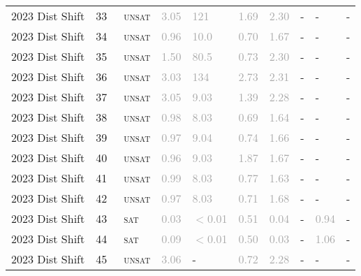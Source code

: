 \begin{center}
{\begin{longtable}{@{}llllllllll@{}}
2023 Dist Shift & 33 & ~\textsc{unsat} & \textcolor{darkgray}{3.05} & \textcolor{darkgray}{121} & \textcolor{darkgray}{1.69} & \textcolor{darkgray}{2.30} & - & - & - \\
2023 Dist Shift & 34 & ~\textsc{unsat} & \textcolor{darkgray}{0.96} & \textcolor{darkgray}{10.0} & \textcolor{darkgray}{0.70} & \textcolor{darkgray}{1.67} & - & - & - \\
2023 Dist Shift & 35 & ~\textsc{unsat} & \textcolor{darkgray}{1.50} & \textcolor{darkgray}{80.5} & \textcolor{darkgray}{0.73} & \textcolor{darkgray}{2.30} & - & - & - \\
2023 Dist Shift & 36 & ~\textsc{unsat} & \textcolor{darkgray}{3.03} & \textcolor{darkgray}{134} & \textcolor{darkgray}{2.73} & \textcolor{darkgray}{2.31} & - & - & - \\
2023 Dist Shift & 37 & ~\textsc{unsat} & \textcolor{darkgray}{3.05} & \textcolor{darkgray}{9.03} & \textcolor{darkgray}{1.39} & \textcolor{darkgray}{2.28} & - & - & - \\
2023 Dist Shift & 38 & ~\textsc{unsat} & \textcolor{darkgray}{0.98} & \textcolor{darkgray}{8.03} & \textcolor{darkgray}{0.69} & \textcolor{darkgray}{1.64} & - & - & - \\
2023 Dist Shift & 39 & ~\textsc{unsat} & \textcolor{darkgray}{0.97} & \textcolor{darkgray}{9.04} & \textcolor{darkgray}{0.74} & \textcolor{darkgray}{1.66} & - & - & - \\
2023 Dist Shift & 40 & ~\textsc{unsat} & \textcolor{darkgray}{0.96} & \textcolor{darkgray}{9.03} & \textcolor{darkgray}{1.87} & \textcolor{darkgray}{1.67} & - & - & - \\
2023 Dist Shift & 41 & ~\textsc{unsat} & \textcolor{darkgray}{0.99} & \textcolor{darkgray}{8.03} & \textcolor{darkgray}{0.77} & \textcolor{darkgray}{1.63} & - & - & - \\
2023 Dist Shift & 42 & ~\textsc{unsat} & \textcolor{darkgray}{0.97} & \textcolor{darkgray}{8.03} & \textcolor{darkgray}{0.71} & \textcolor{darkgray}{1.68} & - & - & - \\
2023 Dist Shift & 43 & ~\textsc{sat} & \textcolor{darkgray}{0.03} & \textcolor{darkgray}{$<$0.01} & \textcolor{darkgray}{0.51} & \textcolor{darkgray}{0.04} & - & \textcolor{darkgray}{0.94} & - \\
2023 Dist Shift & 44 & ~\textsc{sat} & \textcolor{darkgray}{0.09} & \textcolor{darkgray}{$<$0.01} & \textcolor{darkgray}{0.50} & \textcolor{darkgray}{0.03} & - & \textcolor{darkgray}{1.06} & - \\
2023 Dist Shift & 45 & ~\textsc{unsat} & \textcolor{darkgray}{3.06} & - & \textcolor{darkgray}{0.72} & \textcolor{darkgray}{2.28} & - & - & - \\

\end{longtable}}
\end{center}
